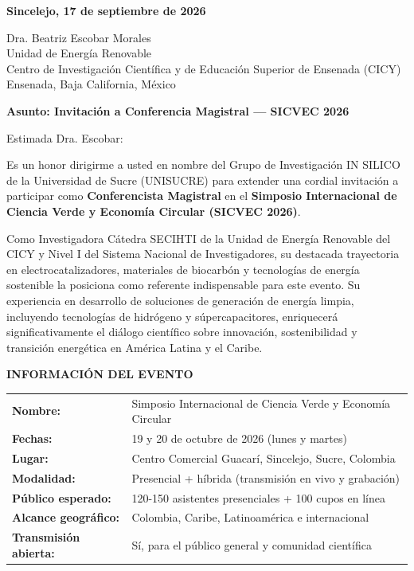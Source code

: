 \documentclass[12pt,a4paper]{article}
\begin{document}
\vspace{0.5cm}

\noindent
\textbf{Sincelejo, 17 de septiembre de 2026}

\vspace{0.8cm}

\noindent
Dra. Beatriz Escobar Morales\\
Unidad de Energía Renovable\\
Centro de Investigación Científica y de Educación Superior de Ensenada (CICY)\\
Ensenada, Baja California, México

\vspace{0.8cm}

\noindent
\textbf{\large Asunto: Invitación a Conferencia Magistral — SICVEC 2026}

\vspace{0.8cm}

Estimada Dra. Escobar:

\vspace{0.8cm}

Es un honor dirigirme a usted en nombre del Grupo de Investigación IN SILICO de la Universidad de Sucre (UNISUCRE) para extender una cordial invitación a participar como \textbf{Conferencista Magistral} en el \textbf{Simposio Internacional de Ciencia Verde y Economía Circular (SICVEC 2026)}.

Como Investigadora Cátedra SECIHTI de la Unidad de Energía Renovable del CICY y Nivel I del Sistema Nacional de Investigadores, su destacada trayectoria en electrocatalizadores, materiales de biocarbón y tecnologías de energía sostenible la posiciona como referente indispensable para este evento. Su experiencia en desarrollo de soluciones de generación de energía limpia, incluyendo tecnologías de hidrógeno y súpercapacitores, enriquecerá significativamente el diálogo científico sobre innovación, sostenibilidad y transición energética en América Latina y el Caribe.

\vspace{0.5cm}

\noindent
\textbf{INFORMACIÓN DEL EVENTO}

\begin{tabular}{ll}
\textbf{Nombre:} & Simposio Internacional de Ciencia Verde y Economía Circular \\
\textbf{Fechas:} & 19 y 20 de octubre de 2026 (lunes y martes) \\
\textbf{Lugar:} & Centro Comercial Guacarí, Sincelejo, Sucre, Colombia \\
\textbf{Modalidad:} & Presencial + híbrida (transmisión en vivo y grabación) \\
\textbf{Público esperado:} & 120-150 asistentes presenciales + 100 cupos en línea \\
\textbf{Alcance geográfico:} & Colombia, Caribe, Latinoamérica e internacional \\
\textbf{Transmisión abierta:} & Sí, para el público general y comunidad científica \\
\end{tabular}
\end{document}
